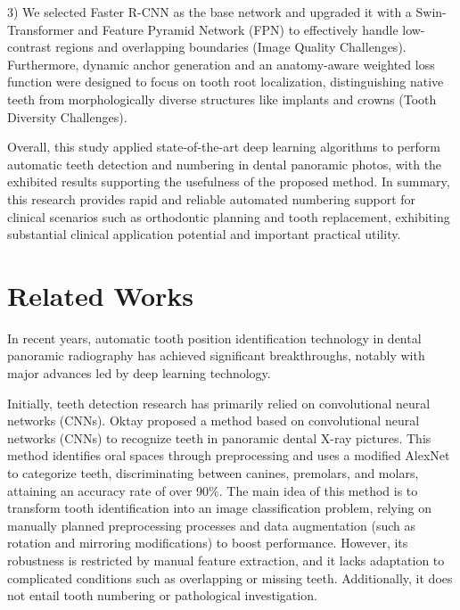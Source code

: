 \documentclass[pdflatex,sn-mathphys-num]{sn-jnl}%
\theoremstyle{thmstyleone}%
\theoremstyle{thmstyletwo}%
\theoremstyle{thmstylethree}%
\begin{document}
 3) We selected Faster R-CNN as the base network and upgraded it with a Swin-Transformer and Feature Pyramid Network (FPN) to effectively handle low-contrast regions and overlapping boundaries (Image Quality Challenges). Furthermore, dynamic anchor generation and an anatomy-aware weighted loss function were designed to focus on tooth root localization, distinguishing native teeth from morphologically diverse structures like implants and crowns (Tooth Diversity Challenges).

 Overall, this study applied state-of-the-art deep learning algorithms to perform automatic teeth detection and numbering in dental panoramic photos, with the exhibited results supporting the usefulness of the proposed method.  In summary, this research provides rapid and reliable automated numbering support for clinical scenarios such as orthodontic planning and tooth replacement, exhibiting substantial clinical application potential and important practical utility.

 \section{Related Works}

In recent years, automatic tooth position identification technology in dental panoramic radiography has achieved significant breakthroughs, notably with major advances led by deep learning technology.

 Initially, teeth detection research has primarily relied on convolutional neural networks (CNNs).  Oktay\cite{r1} proposed a method based on convolutional neural networks (CNNs) to recognize teeth in panoramic dental X-ray pictures.  This method identifies oral spaces through preprocessing and uses a modified AlexNet to categorize teeth, discriminating between canines, premolars, and molars, attaining an accuracy rate of over 90\%.  The main idea of this method is to transform tooth identification into an image classification problem, relying on manually planned preprocessing processes and data augmentation (such as rotation and mirroring modifications) to boost performance.  However, its robustness is restricted by manual feature extraction, and it lacks adaptation to complicated conditions such as overlapping or missing teeth.  Additionally, it does not entail tooth numbering or pathological investigation.
\end{document}
